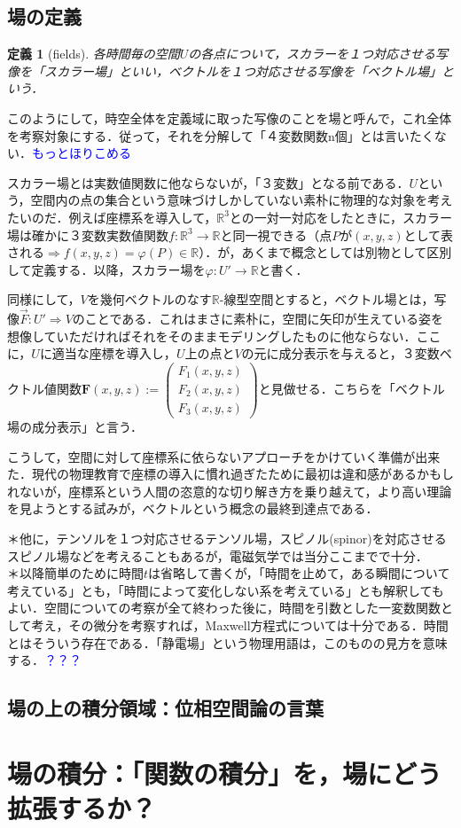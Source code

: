 \documentclass[uplatex, 12pt, a4paper]{jsarticle}
\newtheorem{definition}{定義}
\begin{document}
\subsection{場の定義}

\begin{shadebox} \begin{definition}[fields]
    各時間毎の空間$U$の各点について，スカラーを１つ対応させる写像を「スカラー場」といい，ベクトルを１つ対応させる写像を「ベクトル場」という．
\end{definition} \end{shadebox} 


このようにして，時空全体を定義域に取った写像のことを場と呼んで，これ全体を考察対象にする．従って，それを分解して「４変数関数n個」とは言いたくない．\textcolor{blue}{もっとほりこめる}

スカラー場とは実数値関数に他ならないが，「３変数」となる前である．$U$という，空間内の点の集合という意味づけしかしていない素朴に物理的な対象を考えたいのだ．例えば座標系を導入して，$\mathbb{R}^3$との一対一対応をしたときに，スカラー場は確かに３変数実数値関数$f:\mathbb{R}^3 \longrightarrow \mathbb{R}$と同一視できる（点$P$が$(x,y,z)$として表される$\Longrightarrow f(x,y,z)=\varphi(P) \in \mathbb{R}$）．が，あくまで概念としては別物として区別して定義する．以降，スカラー場を$\varphi : U' \longrightarrow \mathbb{R}$と書く．

同様にして，$V$を幾何ベクトルのなす$\mathbb{R}$-線型空間とすると，ベクトル場とは，写像$\vec{F}:U' \Longrightarrow V$のことである．これはまさに素朴に，空間に矢印が生えている姿を想像していただければそれをそのままモデリングしたものに他ならない．ここに，$U$に適当な座標を導入し，$U$上の点と$V$の元に成分表示を与えると，３変数ベクトル値関数$\mathbf{F}(x,y,z) := \left( \begin{array}{c} F_1(x,y,z) \\ F_2(x,y,z) \\ F_3(x,y,z) \end{array} \right)$と見做せる．こちらを「ベクトル場の成分表示」と言う．

こうして，空間に対して座標系に依らないアプローチをかけていく準備が出来た．現代の物理教育で座標の導入に慣れ過ぎたために最初は違和感があるかもしれないが，座標系という人間の恣意的な切り解き方を乗り越えて，より高い理論を見ようとする試みが，ベクトルという概念の最終到達点である．

\noindent
＊他に，テンソルを１つ対応させるテンソル場，スピノル(spinor)を対応させるスピノル場などを考えることもあるが，電磁気学では当分ここまでで十分．\\
＊以降簡単のために時間$t$は省略して書くが，「時間を止めて，ある瞬間について考えている」とも，「時間によって変化しない系を考えている」とも解釈してもよい．空間についての考察が全て終わった後に，時間を引数とした一変数関数として考え，その微分を考察すれば，Maxwell方程式については十分である．時間とはそういう存在である．「静電場」という物理用語は，このものの見方を意味する．\textcolor{blue}{？？？}

\subsection{場の上の積分領域：位相空間論の言葉}

\section{場の積分：「関数の積分」を，場にどう拡張するか？}
\end{document}
